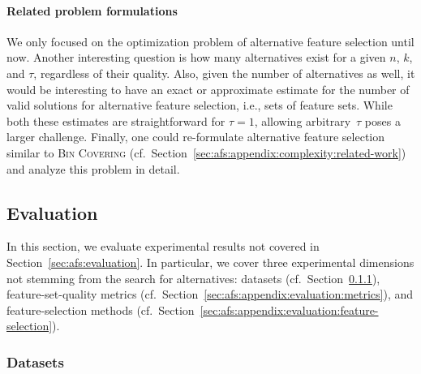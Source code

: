 \documentclass{article}
\theoremstyle{definition}
\begin{document}
\paragraph{Related problem formulations}

We only focused on the optimization problem of alternative feature selection until now.
Another interesting question is how many alternatives exist for a given $n$, $k$, and $\tau$, regardless of their quality.
Also, given the number of alternatives as well, it would be interesting to have an exact or approximate estimate for the number of valid solutions for alternative feature selection, i.e., sets of feature sets.
While both these estimates are straightforward for $\tau = 1$, allowing arbitrary~$\tau$ poses a larger challenge.
Finally, one could re-formulate alternative feature selection similar to \textsc{Bin Covering} (cf.~Section~\ref{sec:afs:appendix:complexity:related-work}) and analyze this problem in detail.

\subsection{Evaluation}
\label{sec:afs:appendix:evaluation}

In this section, we evaluate experimental results not covered in Section~\ref{sec:afs:evaluation}.
In particular, we cover three experimental dimensions not stemming from the search for alternatives:
datasets (cf.~Section~\ref{sec:afs:appendix:evaluation:datasets}), feature-set-quality metrics (cf.~Section~\ref{sec:afs:appendix:evaluation:metrics}), and feature-selection methods (cf.~Section~\ref{sec:afs:appendix:evaluation:feature-selection}).

\subsubsection{Datasets}
\label{sec:afs:appendix:evaluation:datasets}
\end{document}
